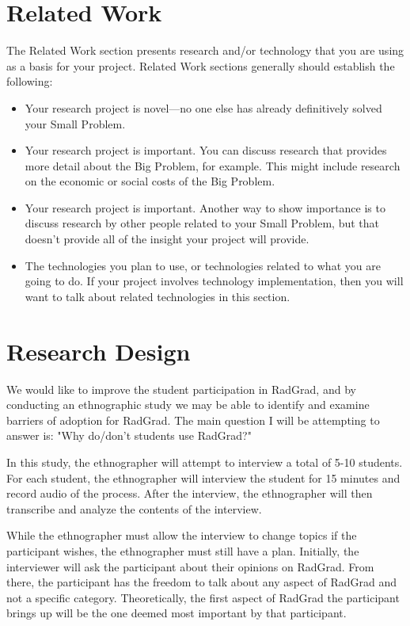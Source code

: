 \documentclass[english]{proposalnsf}
\begin{document}
\section{Related Work}
\label{related-work}

The Related Work section presents research and/or technology that you are using as a basis for your project.  Related Work sections generally should establish the following:

\begin{itemize}
\item Your research project is novel---no one else has already definitively solved your Small Problem.
\item Your research project is important. You can discuss research that provides more detail about the Big Problem, for example. This might include research on the economic or social costs of the Big Problem.
\item Your research project is important.  Another way to show importance is to discuss research by other people related to your Small Problem, but that doesn't provide all of the insight your project will provide.
\item The technologies you plan to use, or technologies related to what you are going to do. If your project involves technology implementation, then you will want to talk about related technologies in this section.
\end{itemize}


\section{Research Design}
\label{research-design}

We would like to improve the student participation in RadGrad, and by conducting an ethnographic study we may be able to identify and examine barriers of adoption for RadGrad. The main question I will be attempting to answer is: "Why do/don't students use RadGrad?"

In this study, the ethnographer will attempt to interview a total of 5-10 students. For each student, the ethnographer will interview the student for 15 minutes and record audio of the process. After the interview, the ethnographer will then transcribe and analyze the contents of the interview. 

While the ethnographer must allow the interview to change topics if the participant wishes, the ethnographer must still have a plan. Initially, the interviewer will ask the participant about their opinions on RadGrad. From there, the participant has the freedom to talk about any aspect of RadGrad and not a specific category. Theoretically, the first aspect of RadGrad the participant brings up will be the one deemed most important by that participant. 
\end{document}

